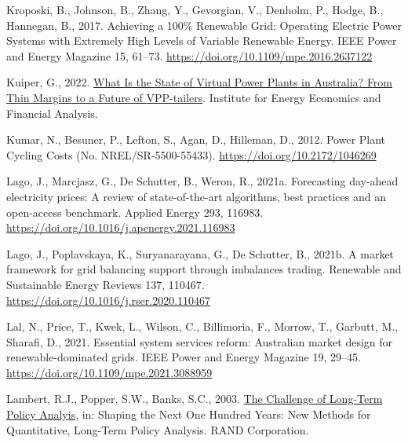\documentclass[12pt,a4paper,]{report}
\newlength{\cslhangindent}
\newenvironment{CSLReferences}[2] %
 {%
  \setlength{\parindent}{0pt}
  \ifodd #1 \everypar{\setlength{\hangindent}{\cslhangindent}}\ignorespaces\fi
  \ifnum #2 > 0
  \setlength{\parskip}{#2\baselineskip}
  \fi
 }%
 {}
\begin{document}
\begin{CSLReferences}{1}{0}
\leavevmode{}%
Kroposki, B., Johnson, B., Zhang, Y., Gevorgian, V., Denholm, P., Hodge,
B., Hannegan, B., 2017. Achieving a 100\% {Renewable Grid}: {Operating
Electric Power Systems} with {Extremely High Levels} of {Variable
Renewable Energy}. IEEE Power and Energy Magazine 15, 61--73.
\url{https://doi.org/10.1109/mpe.2016.2637122}

\leavevmode{}%
Kuiper, G., 2022.
\href{https://ieefa.org/wp-content/uploads/2022/03/What-Is-the-State-of-Virtual-Power-Plants-in-Australia_March-2022_2.pdf}{What
{Is} the {State} of {Virtual Power Plants} in {Australia}? {From Thin
Margins} to a {Future} of {VPP-tailers}}. {Institute for Energy
Economics and Financial Analysis}.

\leavevmode{}%
Kumar, N., Besuner, P., Lefton, S., Agan, D., Hilleman, D., 2012. Power
{Plant Cycling Costs} (No. NREL/SR-5500-55433).
\url{https://doi.org/10.2172/1046269}

\leavevmode{}%
Lago, J., Marcjasz, G., De Schutter, B., Weron, R., 2021a. Forecasting
day-ahead electricity prices: {A} review of state-of-the-art algorithms,
best practices and an open-access benchmark. Applied Energy 293, 116983.
\url{https://doi.org/10.1016/j.apenergy.2021.116983}

\leavevmode{}%
Lago, J., Poplavskaya, K., Suryanarayana, G., De Schutter, B., 2021b. A
market framework for grid balancing support through imbalances trading.
Renewable and Sustainable Energy Reviews 137, 110467.
\url{https://doi.org/10.1016/j.rser.2020.110467}

\leavevmode{}%
Lal, N., Price, T., Kwek, L., Wilson, C., Billimoria, F., Morrow, T.,
Garbutt, M., Sharafi, D., 2021. Essential system services reform:
{Australian} market design for renewable-dominated grids. IEEE Power and
Energy Magazine 19, 29--45.
\url{https://doi.org/10.1109/mpe.2021.3088959}

\leavevmode{}%
Lambert, R.J., Popper, S.W., Banks, S.C., 2003.
\href{https://www.jstor.org/stable/10.7249/mr1626rpc.9?seq=5}{The
{Challenge} of {Long-Term Policy Analyis}}, in: Shaping the {Next One
Hundred Years}: {New Methods} for {Quantitative}, {Long-Term Policy
Analysis}. RAND Corporation.


\end{CSLReferences}
\end{document}
